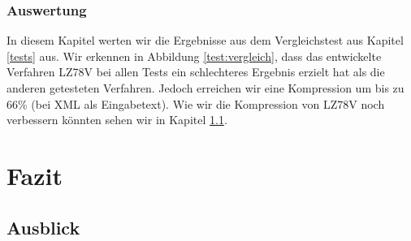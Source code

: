 \documentclass[a4paper,11pt]{scrartcl}%
\theoremstyle{change}
\theoremstyle{nonumberplain}
\theoremstyle{change}
\theoremstyle{nonumberplain}
\theoremstyle{change}
\theoremstyle{nonumberplain}
\begin{document}
\subsubsection{Auswertung}

In diesem Kapitel werten wir die Ergebnisse aus dem Vergleichstest aus Kapitel \ref{tests} aus. Wir erkennen in Abbildung \ref{test:vergleich}, dass das entwickelte Verfahren LZ78V bei allen Tests ein schlechteres Ergebnis erzielt hat als die anderen getesteten Verfahren. Jedoch erreichen wir eine Kompression um bis zu 66\% (bei XML als Eingabetext).
Wie wir die Kompression von LZ78V noch verbessern könnten sehen wir in Kapitel \ref{ausblick}.

\section{Fazit}

\subsection{Ausblick} \label{ausblick}




\newpage
	
\end{document}
